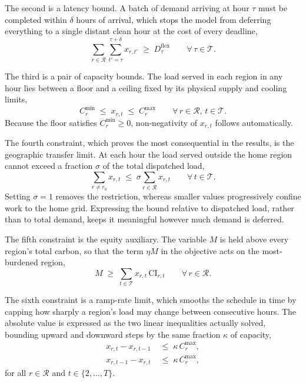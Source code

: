 The second is a latency bound. A batch of demand arriving at hour $\tau$ must be completed within $\delta$ hours of arrival, which stops the model from deferring everything to a single distant clean hour at the cost of every deadline,
\begin{equation}
\sum_{r \in \mathcal{R}} \sum_{t'=\tau}^{\tau+\delta} x_{r,t'} \;\geq\; D^{\text{flex}}_{\tau} \qquad \forall\, \tau \in \mathcal{T}. \tag{C2}\label{eq:c2}
\end{equation}

The third is a pair of capacity bounds. The load served in each region in any hour lies between a floor and a ceiling fixed by its physical supply and cooling limits,
\begin{equation}
C^{\min}_{r} \;\leq\; x_{r,t} \;\leq\; C^{\max}_{r} \qquad \forall\, r \in \mathcal{R},\, t \in \mathcal{T}. \tag{C3}\label{eq:c3}
\end{equation}
Because the floor satisfies $C^{\min}_{r} \geq 0$, non-negativity of $x_{r,t}$ follows automatically.

The fourth constraint, which proves the most consequential in the results, is the geographic transfer limit. At each hour the load served outside the home region cannot exceed a fraction $\sigma$ of the total dispatched load,
\begin{equation}
\sum_{r \neq r_0} x_{r,t} \;\leq\; \sigma \sum_{r \in \mathcal{R}} x_{r,t} \qquad \forall\, t \in \mathcal{T}. \tag{C4}\label{eq:c4}
\end{equation}
Setting $\sigma = 1$ removes the restriction, whereas smaller values progressively confine work to the home grid. Expressing the bound relative to dispatched load, rather than to total demand, keeps it meaningful however much demand is deferred.

The fifth constraint is the equity auxiliary. The variable $M$ is held above every region's total carbon, so that the term $\eta M$ in the objective acts on the most-burdened region,
\begin{equation}
M \;\geq\; \sum_{t \in \mathcal{T}} x_{r,t}\, \text{CI}_{r,t} \qquad \forall\, r \in \mathcal{R}. \tag{C5}\label{eq:c5}
\end{equation}

The sixth constraint is a ramp-rate limit, which smooths the schedule in time by capping how sharply a region's load may change between consecutive hours. The absolute value is expressed as the two linear inequalities actually solved, bounding upward and downward steps by the same fraction $\kappa$ of capacity,
\begin{align}
x_{r,t} - x_{r,t-1} &\;\leq\; \kappa\, C^{\max}_{r}, \tag{C6a}\label{eq:c6a}\\
x_{r,t-1} - x_{r,t} &\;\leq\; \kappa\, C^{\max}_{r}, \tag{C6b}\label{eq:c6b}
\end{align}
for all $r \in \mathcal{R}$ and $t \in \{2, \dots, T\}$.

